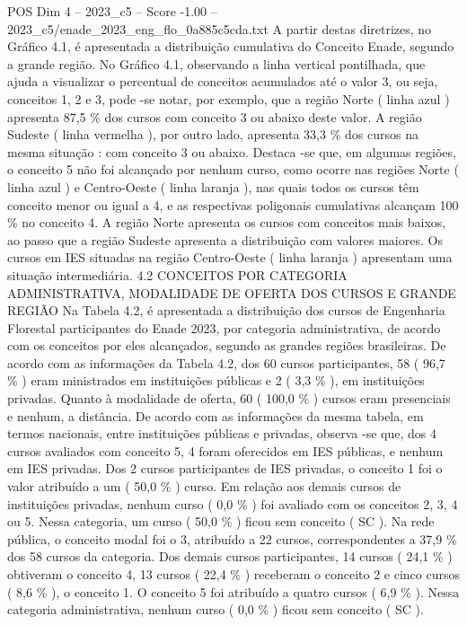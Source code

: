 \begin{textsample}{POS Dim 4 – 2023\_c5 – Score -1.00 – 2023\_c5/enade\_2023\_eng\_flo\_0a885c5cda.txt}
A partir destas diretrizes, no Gráfico 4.1, é apresentada a distribuição cumulativa do Conceito Enade, segundo a grande região.
No Gráfico 4.1, observando a linha vertical pontilhada, que ajuda a visualizar o percentual de conceitos acumulados até o valor 3, ou seja, conceitos 1, 2 e 3, pode -se notar, por exemplo, que a região Norte ( linha azul ) apresenta 87,5 \% dos cursos com conceito 3 ou abaixo deste valor.
A região Sudeste ( linha vermelha ), por outro lado, apresenta 33,3 \% dos cursos na mesma situação : com conceito 3 ou abaixo.
Destaca -se que, em algumas regiões, o conceito 5 não foi alcançado por nenhum curso, como ocorre nas regiões Norte ( linha azul ) e Centro-Oeste ( linha laranja ), nas quais todos os cursos têm conceito menor ou igual a 4, e as respectivas poligonais cumulativas alcançam 100 \% no conceito 4.
A região Norte apresenta os cursos com conceitos mais baixos, ao passo que a região Sudeste apresenta a distribuição com valores maiores.
Os cursos em IES situadas na região Centro-Oeste ( linha laranja ) apresentam uma situação intermediária. 4.2 CONCEITOS POR CATEGORIA ADMINISTRATIVA, MODALIDADE DE OFERTA DOS CURSOS E GRANDE REGIÃO Na Tabela 4.2, é apresentada a distribuição dos cursos de Engenharia Florestal participantes do Enade 2023, por categoria administrativa, de acordo com os conceitos por eles alcançados, segundo as grandes regiões brasileiras.
De acordo com as informações da Tabela 4.2, dos 60 cursos participantes, 58 ( 96,7 \% ) eram ministrados em instituições públicas e 2 ( 3,3 \% ), em instituições privadas.
Quanto à modalidade de oferta, 60 ( 100,0 \% ) cursos eram presenciais e nenhum, a distância.
De acordo com as informações da mesma tabela, em termos nacionais, entre instituições públicas e privadas, observa -se que, dos 4 cursos avaliados com conceito 5, 4 foram oferecidos em IES públicas, e nenhum em IES privadas.
Dos 2 cursos participantes de IES privadas, o conceito 1 foi o valor atribuído a um ( 50,0 \% ) curso.
Em relação aos demais cursos de instituições privadas, nenhum curso ( 0,0 \% ) foi avaliado com os conceitos 2, 3, 4 ou 5.
Nessa categoria, um curso ( 50,0 \% ) ficou sem conceito ( SC ).
Na rede pública, o conceito modal foi o 3, atribuído a 22 cursos, correspondentes a 37,9 \% dos 58 cursos da categoria.
Dos demais cursos participantes, 14 cursos ( 24,1 \% ) obtiveram o conceito 4, 13 cursos ( 22,4 \% ) receberam o conceito 2 e cinco cursos ( 8,6 \% ), o conceito 1.
O conceito 5 foi atribuído a quatro cursos ( 6,9 \% ).
Nessa categoria administrativa, nenhum curso ( 0,0 \% ) ficou sem conceito ( SC ).

\end{textsample}
